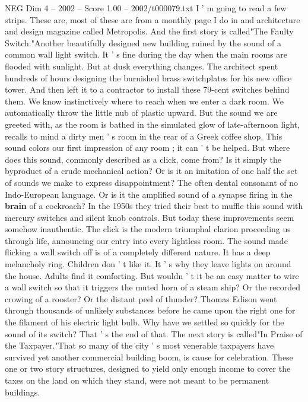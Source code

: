 \begin{textsample}{NEG Dim 4 – 2002 – Score 1.00 – 2002/t000079.txt}  \label{ex:f4_neg_059}
I ' m going to read a few strips.
These are, most of these are from a monthly page I do in and architecture and design magazine called Metropolis.
And the first story is called"The Faulty Switch."Another beautifully designed new building ruined by the sound of a common wall light switch.
It ' s fine during the day when the main rooms are flooded with sunlight.
But at dusk everything changes.
The architect spent hundreds of hours designing the burnished brass switchplates for his new office tower.
And then left it to a contractor to install these 79-cent switches behind them.
We know instinctively where to reach when we enter a dark room.
We automatically throw the little nub of plastic upward.
But the sound we are greeted with, as the room is bathed in the simulated glow of late-afternoon light, recalls to mind a dirty men ' s room in the rear of a Greek coffee shop.
This sound colors our first impression of any room ; it can ' t be helped.
But where does this sound, commonly described as a click, come from?
Is it simply the byproduct of a crude mechanical action?
Or is it an imitation of one half the set of sounds we make to express disappointment?
The often dental consonant of no Indo-European language.
Or is it the amplified sound of a synapse firing in the \textbf{brain} of a cockroach?
In the 1950s they tried their best to muffle this sound with mercury switches and silent knob controls.
But today these improvements seem somehow inauthentic.
The click is the modern triumphal clarion proceeding us through life, announcing our entry into every lightless room.
The sound made flicking a wall switch off is of a completely different nature.
It has a deep melancholy ring.
Children don ' t like it.
It ' s why they leave lights on around the house.
Adults find it comforting.
But wouldn ' t it be an easy matter to wire a wall switch so that it triggers the muted horn of a steam ship?
Or the recorded crowing of a rooster?
Or the distant peel of thunder?
Thomas Edison went through thousands of unlikely substances before he came upon the right one for the filament of his electric light bulb.
Why have we settled so quickly for the sound of its switch?
That ' s the end of that.
The next story is called"In Praise of the Taxpayer."That so many of the city ' s most venerable taxpayers have survived yet another commercial building boom, is cause for celebration.
These one or two story structures, designed to yield only enough income to cover the taxes on the land on which they stand, were not meant to be permanent buildings.

\end{textsample}
